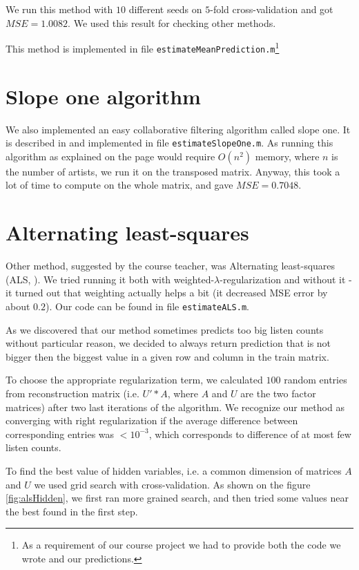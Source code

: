 \documentclass{report}
\begin{document}
We run this method with $10$ different seeds on $5$-fold cross-validation and got $MSE=1.0082$. %
We used this result for checking other methods.

This method is implemented in file \texttt{estimateMeanPrediction.m}\footnote{As a requirement of our course project we had to provide both the code we wrote and our predictions.}

\section{Slope one algorithm}
We also implemented an easy collaborative filtering algorithm called slope one. It is described in \cite{slope} and implemented in file \texttt{estimateSlopeOne.m}. As running this algorithm as explained on the page would require $O(n^2)$ memory, where $n$ is the number of artists, we run it on the transposed matrix. Anyway, this took a lot of time to compute on the whole matrix, and gave $MSE=0.7048$.%

\section{Alternating least-squares}
Other method, suggested by the course teacher, was Alternating least-squares (ALS, \cite{als}). We tried running it both with weighted-$\lambda$-regularization and without it - it turned out that weighting actually helps a bit (it decreased MSE error by about $0.2$). Our code can be found in file \texttt{estimateALS.m}.

As we discovered that our method sometimes predicts too big listen counts without particular reason, we decided to always return prediction that is not bigger then the biggest value in a given row and column in the train matrix.

 To choose the appropriate regularization term, we calculated $100$ random entries from reconstruction matrix (i.e. $U' * A$, where $A$ and $U$ are the two factor matrices) after two last iterations of the algorithm. We recognize our method as converging with right regularization if the average difference between corresponding entries was $< 10^{-3}$, which corresponds to difference of at most few listen counts.

To find the best value of hidden variables, i.e. a common dimension of matrices $A$ and $U$ we used grid search with cross-validation. As shown on the figure \ref{fig:alsHidden}, we first ran more grained search, and then tried some values near the best found in the first step.
\end{document}
